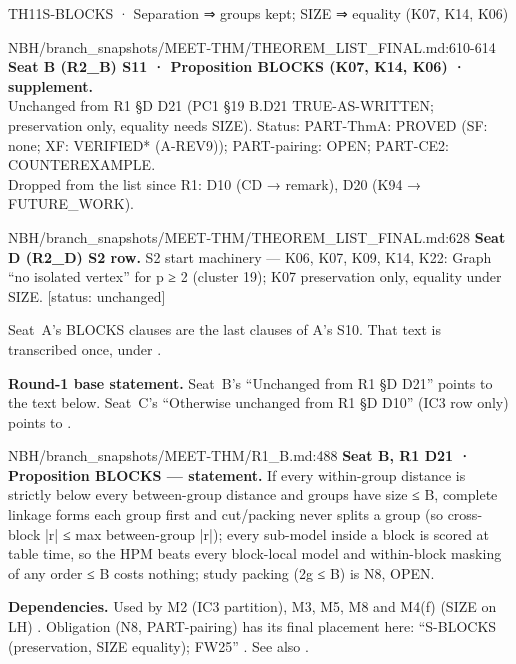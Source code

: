 \begin{card}{TH11}{S-BLOCKS · Separation ⇒ groups kept; SIZE ⇒ equality (K07, K14, K06)}
\begin{stmt}{NBH/branch_snapshots/MEET-THM/THEOREM_LIST_FINAL.md:610-614}
\textbf{Seat B (R2\_B) S11 · Proposition BLOCKS (K07, K14, K06) · supplement.}\\
Unchanged from R1 §D D21 (PC1 §19 B.D21 TRUE-AS-WRITTEN; preservation only, equality needs SIZE). Status: PART-ThmA: PROVED (SF: none; XF: VERIFIED* (A-REV9)); PART-pairing: OPEN; PART-CE2: COUNTEREXAMPLE.\\
Dropped from the list since R1: D10 (CD → remark), D20 (K94 → FUTURE\_WORK).
\end{stmt}

\begin{stmt}{NBH/branch_snapshots/MEET-THM/THEOREM_LIST_FINAL.md:628}
\textbf{Seat D (R2\_D) S2 row.} S2 start machinery — K06, K07, K09, K14, K22: Graph ``no isolated vertex'' for p ≥ 2 (cluster 19); K07 preservation only, equality under SIZE. [status: unchanged]
\end{stmt}
Seat~A's BLOCKS clauses are the last clauses of A's S10. That text is transcribed once, under  .

\textbf{Round-1 base statement.} Seat~B's ``Unchanged from R1 §D D21'' points to the text below. Seat~C's ``Otherwise unchanged from R1 §D D10'' (IC3 row only) points to .
\begin{stmt}{NBH/branch_snapshots/MEET-THM/R1_B.md:488}
\textbf{Seat B, R1 D21 · Proposition BLOCKS — statement.} If every within-group distance is strictly below every between-group distance and groups have size ≤ B, complete linkage forms each group first and cut/packing never splits a group (so cross-block |r| ≤ max between-group |r|); every sub-model inside a block is scored at table time, so the HPM beats every block-local model and within-block masking of any order ≤ B costs nothing; study packing (2g ≤ B) is N8, OPEN.
\end{stmt}

\textbf{Dependencies.} Used by M2 (IC3 partition), M3, M5, M8 and M4(f) (SIZE on LH) . Obligation  (N8, PART-pairing) has its final placement here: ``S-BLOCKS (preservation, SIZE equality); FW25'' . See also .


\end{card}
